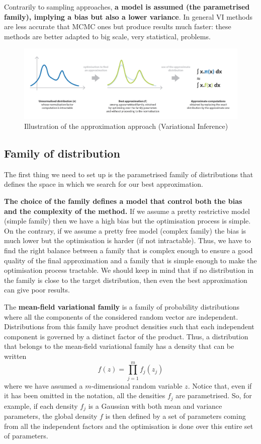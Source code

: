 Contrarily to sampling approaches, \textbf{a model is assumed (the parametrised family), implying a bias but also a lower variance}. In general VI methods are less accurate that MCMC ones but produce results much faster: these methods are better adapted to big scale, very statistical, problems.


\begin{figure}[h]
    \centering
\includegraphics[width=\textwidth]{pic/p05c07-snip06.png}
    \caption{Illustration of the approximation approach (Variational Inference)}
    \label{fig:p05c07-snip06}
\end{figure}

\subsection{Family of distribution}

The first thing we need to set up is the parametrised family of distributions that defines the space in which we search for our best approximation.

\textbf{The choice of the family defines a model that control both the bias and the complexity of the method. }If we assume a pretty restrictive model (simple family) then we have a high bias but the optimisation process is simple. On the contrary, if we assume a pretty free model (complex family) the bias is much lower but the optimisation is harder (if not intractable). Thus, we have to find the right balance between a family that is complex enough to ensure a good quality of the final approximation and a family that is simple enough to make the optimisation process tractable. We should keep in mind that if no distribution in the family is close to the target distribution, then even the best approximation can give poor results.

The \textbf{mean-field variational family} is a family of probability distributions where all the components of the considered random vector are independent. Distributions from this family have product densities such that each independent component is governed by a distinct factor of the product. Thus, a distribution that belongs to the mean-field variational family has a density that can be written
\begin{equation}f(z)=\prod_{j=1}^{m} f_{j}\left(z_{j}\right)\end{equation}
where we have assumed a $m$-dimensional random variable $z$. Notice that, even if it has been omitted in the notation, all the densities $f_j$ are parametrised. So, for example, if each density $f_j$ is a Gaussian with both mean and variance parameters, the global density $f$ is then defined by a set of parameters coming from all the independent factors and the optimisation is done over this entire set of parameters.


